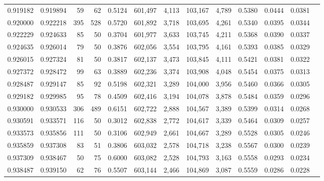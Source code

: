 \begin{tabular}{rrrrrrrrrrrrr}
0.919182 & 0.919894 &    59 &  62 &                                     0.5124 & 601,497 &   4,113 & 103,167 &   4,789 & 0.5380 & 0.0444 & 0.0381 \\
0.920000 & 0.922218 &   395 & 528 &                                     0.5720 & 601,892 &   3,718 & 103,695 &   4,261 & 0.5340 & 0.0395 & 0.0344 \\
0.922229 & 0.924633 &    85 &  50 &                                     0.3704 & 601,977 &   3,633 & 103,745 &   4,211 & 0.5368 & 0.0390 & 0.0337 \\
0.924635 & 0.926014 &    79 &  50 &                                     0.3876 & 602,056 &   3,554 & 103,795 &   4,161 & 0.5393 & 0.0385 & 0.0329 \\
0.926015 & 0.927324 &    81 &  50 &                                     0.3817 & 602,137 &   3,473 & 103,845 &   4,111 & 0.5421 & 0.0381 & 0.0322 \\
0.927372 & 0.928472 &    99 &  63 &                                     0.3889 & 602,236 &   3,374 & 103,908 &   4,048 & 0.5454 & 0.0375 & 0.0313 \\
0.928487 & 0.929147 &    85 &  92 &                                     0.5198 & 602,321 &   3,289 & 104,000 &   3,956 & 0.5460 & 0.0366 & 0.0305 \\
0.929182 & 0.929985 &    95 &  78 &                                     0.4509 & 602,416 &   3,194 & 104,078 &   3,878 & 0.5484 & 0.0359 & 0.0296 \\
0.930000 & 0.930533 &   306 & 489 &                                     0.6151 & 602,722 &   2,888 & 104,567 &   3,389 & 0.5399 & 0.0314 & 0.0268 \\
0.930591 & 0.933571 &   116 &  50 &                                     0.3012 & 602,838 &   2,772 & 104,617 &   3,339 & 0.5464 & 0.0309 & 0.0257 \\
0.933573 & 0.935856 &   111 &  50 &                                     0.3106 & 602,949 &   2,661 & 104,667 &   3,289 & 0.5528 & 0.0305 & 0.0246 \\
0.935859 & 0.937308 &    83 &  51 &                                     0.3806 & 603,032 &   2,578 & 104,718 &   3,238 & 0.5567 & 0.0300 & 0.0239 \\
0.937309 & 0.938467 &    50 &  75 &                                     0.6000 & 603,082 &   2,528 & 104,793 &   3,163 & 0.5558 & 0.0293 & 0.0234 \\
0.938487 & 0.939150 &    62 &  76 &                                     0.5507 & 603,144 &   2,466 & 104,869 &   3,087 & 0.5559 & 0.0286 & 0.0228 \\

\end{tabular}
